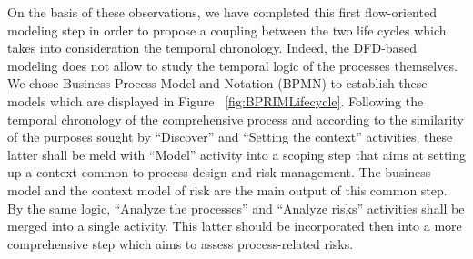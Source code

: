 \documentclass[preprint,3p,times,number]{elsarticle}
\begin{document}
On the basis of these observations, we have completed this first flow-oriented modeling step in order to propose a coupling between the two life cycles which takes into consideration the temporal chronology. Indeed, the DFD-based modeling does not allow to study the temporal logic of the processes themselves. We chose Business Process Model and Notation (BPMN) to establish these models which are displayed in Figure ~\ref{fig:BPRIMLifecycle}. Following the temporal chronology of the comprehensive process and according to the similarity of the purposes sought by \enquote{Discover} and \enquote{Setting the context} activities, these latter shall be meld with \enquote{Model} activity into a scoping step that aims at setting up a context common to process design and risk management. The business model and the context model of risk are the main output of this common step.
By the same logic, \enquote{Analyze the processes} and \enquote{Analyze risks} activities shall be merged into a single activity. This latter should be incorporated then into a more comprehensive step which aims to assess process-related risks. 
\end{document}
